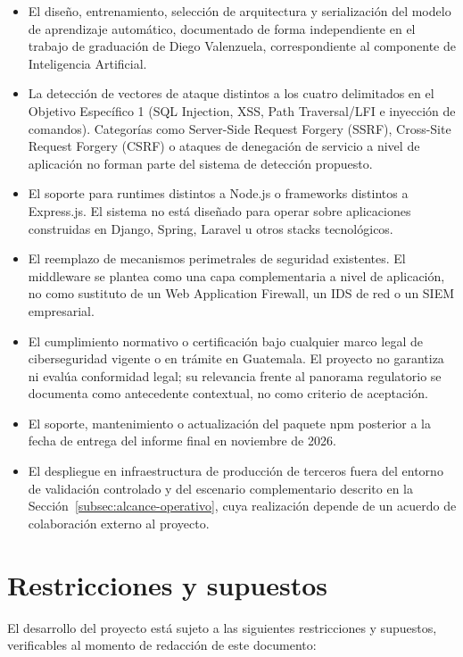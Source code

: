 \begin{itemize}
    \item El diseño, entrenamiento, selección de arquitectura y serialización del modelo de
    aprendizaje automático, documentado de forma independiente en el trabajo de graduación de
    Diego Valenzuela, correspondiente al componente de Inteligencia Artificial.
    \item La detección de vectores de ataque distintos a los cuatro delimitados en el Objetivo
    Específico 1 (SQL Injection, XSS, Path Traversal/LFI e inyección de comandos). Categorías
    como Server-Side Request Forgery (SSRF), Cross-Site Request Forgery (CSRF) o ataques de
    denegación de servicio a nivel de aplicación no forman parte del sistema de detección
    propuesto.
    \item El soporte para runtimes distintos a Node.js o frameworks distintos a Express.js. El
    sistema no está diseñado para operar sobre aplicaciones construidas en Django, Spring,
    Laravel u otros stacks tecnológicos.
    \item El reemplazo de mecanismos perimetrales de seguridad existentes. El middleware se
    plantea como una capa complementaria a nivel de aplicación, no como sustituto de un
    Web Application Firewall, un IDS de red o un SIEM empresarial.
    \item El cumplimiento normativo o certificación bajo cualquier marco legal de ciberseguridad
    vigente o en trámite en Guatemala. El proyecto no garantiza ni evalúa conformidad legal;
    su relevancia frente al panorama regulatorio se documenta como antecedente contextual,
    no como criterio de aceptación.
    \item El soporte, mantenimiento o actualización del paquete npm posterior a la fecha de entrega del informe final en noviembre de 2026.
    \item El despliegue en infraestructura de producción de terceros fuera del entorno de
    validación controlado y del escenario complementario descrito en la Sección~\ref{subsec:alcance-operativo},
    cuya realización depende de un acuerdo de colaboración externo al proyecto.
\end{itemize}

\section{Restricciones y supuestos}
El desarrollo del proyecto está sujeto a las siguientes restricciones y supuestos, verificables al
momento de redacción de este documento:

